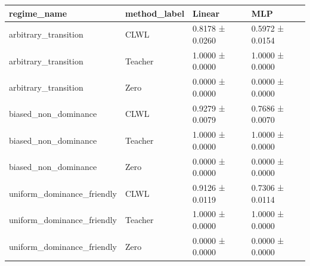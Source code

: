 \begin{tabular}{llll}
\toprule
regime_name & method_label & Linear & MLP \\
\midrule
arbitrary_transition & CLWL & 0.8178 ± 0.0260 & 0.5972 ± 0.0154 \\
arbitrary_transition & Teacher & 1.0000 ± 0.0000 & 1.0000 ± 0.0000 \\
arbitrary_transition & Zero & 0.0000 ± 0.0000 & 0.0000 ± 0.0000 \\
biased_non_dominance & CLWL & 0.9279 ± 0.0079 & 0.7686 ± 0.0070 \\
biased_non_dominance & Teacher & 1.0000 ± 0.0000 & 1.0000 ± 0.0000 \\
biased_non_dominance & Zero & 0.0000 ± 0.0000 & 0.0000 ± 0.0000 \\
uniform_dominance_friendly & CLWL & 0.9126 ± 0.0119 & 0.7306 ± 0.0114 \\
uniform_dominance_friendly & Teacher & 1.0000 ± 0.0000 & 1.0000 ± 0.0000 \\
uniform_dominance_friendly & Zero & 0.0000 ± 0.0000 & 0.0000 ± 0.0000 \\
\bottomrule
\end{tabular}

